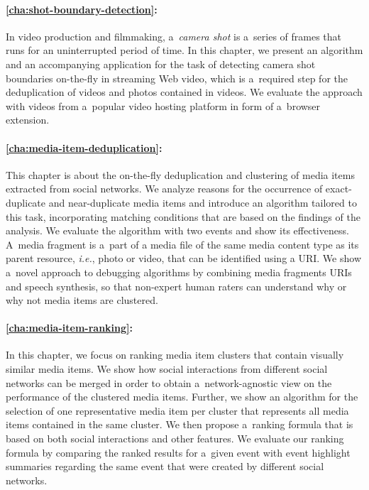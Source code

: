 \paragraph{\autoref{cha:shot-boundary-detection}:}

In video production and filmmaking, a~\emph{camera shot} is a~series of frames
that runs for an uninterrupted period of time.
In this chapter, we present an algorithm and an
accompanying application for the task of detecting
camera shot boundaries on-the-fly in streaming Web video,
which is a~required step for the deduplication of videos
and photos contained in videos.
We evaluate the approach with videos from a~popular video hosting platform in form of a~browser extension.

\paragraph{\autoref{cha:media-item-deduplication}:}

This chapter is about the on-the-fly deduplication and clustering
of media items extracted from social networks.
We analyze reasons for the occurrence of exact-duplicate
and near-duplicate media items and introduce an algorithm
tailored to this task, incorporating matching conditions
that are based on the findings of the analysis.
We evaluate the algorithm with two events
and show its effectiveness.
A~media fragment is a~part of a media file
of the same media content type
as its parent resource, \emph{i.e.}, photo or video,
that can be identified using a URI.
We show a~novel approach to debugging algorithms
by combining media fragments URIs and speech synthesis,
so that non-expert human raters can understand why or why not
media items are clustered.

\paragraph{\autoref{cha:media-item-ranking}:}

In this chapter, we focus on ranking media item clusters
that contain visually similar media items.
We show how social interactions from different social networks
can be merged in order to obtain a~network-agnostic view
on the performance of the clustered media items.
Further, we show an algorithm for the selection of
one representative media item per cluster that represents
all media items contained in the same cluster.
We then propose a~ranking formula that is based on both
social interactions and other features.
We evaluate our ranking formula by comparing the ranked results
for a~given event with event highlight summaries regarding the same event
that were created by different social networks.

